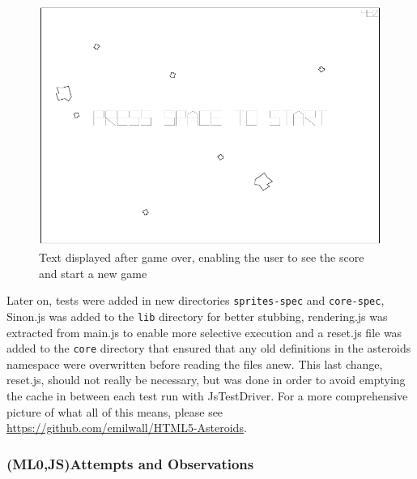 \documentclass[11pt]{article}
\begin{document}
\begin{figure}[h!]
\centering
\includegraphics[width=1.0\textwidth]{pics/game6.png}
\caption{Text displayed after game over, enabling the user to see the score and start a new game}
\label{fig:game6}
\end{figure}

Later on, tests were added in new directories \texttt{sprites-spec} and \texttt{core-spec}, Sinon.js was added to the \texttt{lib} directory for better stubbing, rendering.js was extracted from main.js to enable more selective execution and a reset.js file was added to the \texttt{core} directory that ensured that any old definitions in the asteroids namespace were overwritten before reading the files anew. This last change, reset.js, should not really be necessary, but was done in order to avoid emptying the cache in between each test run with JsTestDriver. For a more comprehensive picture of what all of this means, please see \url{https://github.com/emilwall/HTML5-Asteroids}.

\subsubsection{(ML0,JS)Attempts and Observations}
\end{document}
